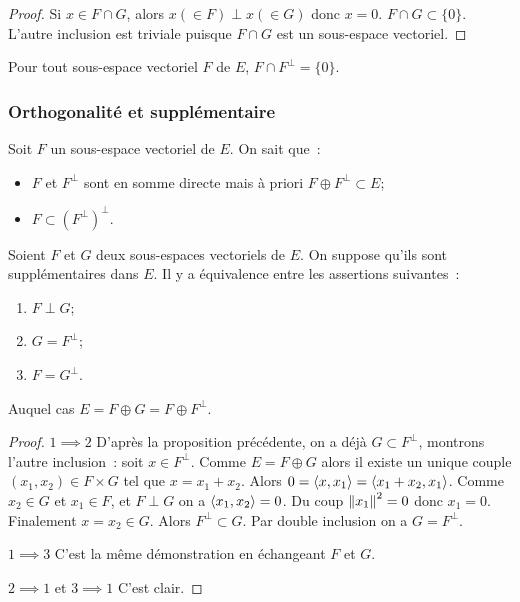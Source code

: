   \begin{proof}
    Si \(x \in F \cap G\), alors \(x (\in F) \perp x (\in G)\) donc \(x=0\).  \(F \cap G \subset \{0\}\). L'autre inclusion est triviale puisque \(F \cap G\) est un sous-espace vectoriel.
  \end{proof}
  \begin{cor}
    Pour tout sous-espace vectoriel \(F\) de \(E\), \(F \cap F^\perp =\{0\}\).
  \end{cor}

  \subsubsection{Orthogonalité et supplémentaire}
  \label{subsec:orthetsupp}

  Soit \(F\) un sous-espace vectoriel de \(E\). On sait que~:
  \begin{itemize}
    \item \(F\) et \(F^\perp\) sont en somme directe mais à priori \(F \oplus F^\perp \subset E\);
    \item \(F \subset (F^\perp)^\perp\).
  \end{itemize}

  \begin{theo}\label{theo:orthetsupp}
    Soient \(F\) et \(G\) deux sous-espaces vectoriels de \(E\). On suppose qu'ils sont supplémentaires dans \(E\). Il y a équivalence entre les assertions suivantes~:
    \begin{enumerate}
      \item \(F \perp G\);
      \item \(G = F^\perp\);
      \item \(F = G^\perp\).
    \end{enumerate}
    Auquel cas \(E = F \oplus G = F \oplus F^\perp\).
  \end{theo}
  \begin{proof}
    \(1 \implies 2\) D'après la proposition précédente, on a déjà \(G \subset F^\perp\), montrons l'autre inclusion~: soit \(x \in F^{\perp}\). Comme \(E=F\oplus G\) alors il existe un unique couple \((x_1,x_2) \in F \times G\) tel que \(x=x_1+x_2\). Alors \(0=\left\langle{x},{x_1}\right\rangle=\left\langle{x_1+x_2},{x_1}\right\rangle\). Comme \(x_2 \in G\) et \(x_1 \in F\), et \(F \perp G\) on a \(\left\langle{x_1},{x_2}\right\rangle=0\). Du coup \(\left\lVert x_1\right\rVert^2=0\) donc \(x_1=0\). Finalement \(x=x_2 \in G\). Alors \(F^\perp \subset G\). Par double inclusion on a \(G=F^\perp\).

    \(1 \implies 3\) C'est la même démonstration en échangeant \(F\) et \(G\).

    \(2 \implies 1\) et \(3 \implies 1\) C'est clair.
  \end{proof}

